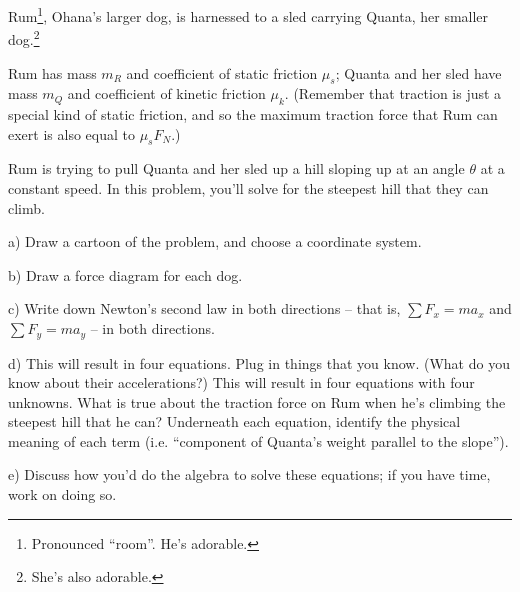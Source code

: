 \documentclass[12pt]{article}
\begin{document}
\newpage


Rum\footnote{Pronounced ``room''. He's adorable.}, Ohana's larger dog, is harnessed to a sled carrying Quanta, her smaller 
dog.\footnote{She's also adorable.} 

Rum has mass $m_R$ and coefficient of static friction $\mu_s$; Quanta and her sled have mass $m_Q$ and coefficient of kinetic friction $\mu_k$. (Remember that traction is just a special kind of static friction, and so the maximum traction force that Rum can exert is also equal to $\mu_s F_N$.)

Rum is trying to pull Quanta and her sled up a hill sloping up at an angle $\theta$ at a constant speed. In this problem, you'll solve for the
steepest hill that they can climb.

a) Draw a cartoon of the problem, and choose a coordinate system. 

\vspace{2in}

b) Draw a force diagram for each dog. 

\vspace{3in}
\newpage
c) Write down Newton's second law in both directions -- that is, $\sum F_x = ma_x$ and $\sum F_y = ma_y$ -- 
in both directions.

\vspace{2in}
d) This will result in four equations. Plug in things that you know. (What do you know about their accelerations?) This will result in four equations with 
four unknowns. What is true about the traction force on Rum when he's climbing the steepest hill that he can?
Underneath each equation, identify the physical meaning of each term (i.e. ``component of Quanta's weight parallel to the slope''). 

\vspace{3.5in}

e) Discuss how you'd do the algebra to solve these equations; if you have time, work on doing so.
\end{document}
